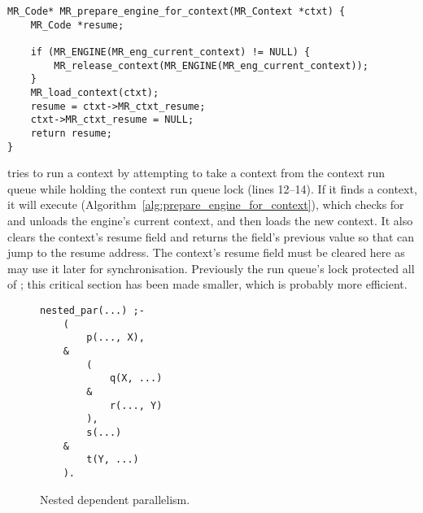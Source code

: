 \begin{algorithm}
\begin{verbatim}
MR_Code* MR_prepare_engine_for_context(MR_Context *ctxt) {
    MR_Code *resume;

    if (MR_ENGINE(MR_eng_current_context) != NULL) {
        MR_release_context(MR_ENGINE(MR_eng_current_context));
    }
    MR_load_context(ctxt);
    resume = ctxt->MR_ctxt_resume;
    ctxt->MR_ctxt_resume = NULL;
    return resume;
}
\end{verbatim}
\caption{\prepareengineforcontext}
\label{alg:prepare_engine_for_context}
\end{algorithm}

\idle tries to run a context by attempting to take a context from the
context run queue while holding the context run queue lock (lines 12--14).
If it finds a context,
it will execute \prepareengineforcontext
(Algorithm~\ref{alg:prepare_engine_for_context}),
which checks for and unloads the engine's current context,
and then loads the new context.
It also clears the context's resume field and returns the field's previous
value so that \idle can jump to the resume address.
The context's resume field must be cleared here as
\joinandcontinue may use it later for synchronisation.
Previously the run queue's lock protected all of \idle;
this critical section has been made smaller,
which is probably more efficient.

\begin{figure}
\begin{center}
\begin{verbatim}
nested_par(...) ;-
    (
        p(..., X),
    &
        (
            q(X, ...)
        &
            r(..., Y)
        ),
        s(...)
    &
        t(Y, ...)
    ).
\end{verbatim}
\end{center}
\caption{Nested dependent parallelism.}
\label{fig:nested_dep_par}
\end{figure}

